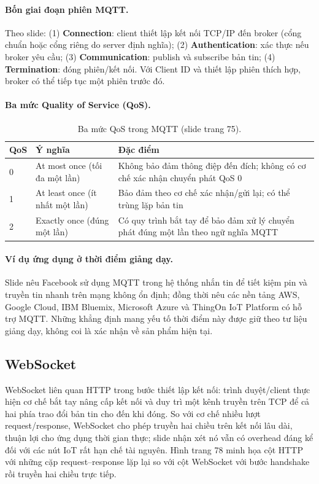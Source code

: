 \paragraph{Bốn giai đoạn phiên MQTT.} Theo slide: (1) \textbf{Connection}: client thiết lập kết nối TCP/IP đến broker (cổng chuẩn hoặc cổng riêng do server định nghĩa); (2) \textbf{Authentication}: xác thực nếu broker yêu cầu; (3) \textbf{Communication}: publish và subscribe bản tin; (4) \textbf{Termination}: đóng phiên/kết nối. Với Client ID và thiết lập phiên thích hợp, broker có thể tiếp tục một phiên trước đó. 

\paragraph{Ba mức Quality of Service (QoS).}
\begin{table}[htbp]\centering\small
\caption{Ba mức QoS trong MQTT (slide trang 75).}
\begin{tabularx}{\textwidth}{p{1.4cm}p{3cm}X}\toprule
QoS & Ý nghĩa & Đặc điểm\\\midrule
0 & At most once (tối đa một lần) & Không bảo đảm thông điệp đến đích; không có cơ chế xác nhận chuyển phát QoS 0\\
1 & At least once (ít nhất một lần) & Bảo đảm theo cơ chế xác nhận/gửi lại; có thể trùng lặp bản tin\\
2 & Exactly once (đúng một lần) & Có quy trình bắt tay để bảo đảm xử lý chuyển phát đúng một lần theo ngữ nghĩa MQTT\\\bottomrule
\end{tabularx}\end{table}

\paragraph{Ví dụ ứng dụng ở thời điểm giảng dạy.} Slide nêu Facebook sử dụng MQTT trong hệ thống nhắn tin để tiết kiệm pin và truyền tin nhanh trên mạng không ổn định; đồng thời nêu các nền tảng AWS, Google Cloud, IBM Bluemix, Microsoft Azure và ThingOn IoT Platform có hỗ trợ MQTT. Những khẳng định mang yếu tố thời điểm này được giữ theo tư liệu giảng dạy, không coi là xác nhận về sản phẩm hiện tại. 

\subsection{WebSocket}
WebSocket liên quan HTTP trong bước thiết lập kết nối: trình duyệt/client thực hiện cơ chế bắt tay nâng cấp kết nối và duy trì một kênh truyền trên TCP để cả hai phía trao đổi bản tin cho đến khi đóng. So với cơ chế nhiều lượt request/response, WebSocket cho phép truyền hai chiều trên kết nối lâu dài, thuận lợi cho ứng dụng thời gian thực; slide nhận xét nó vẫn có overhead đáng kể đối với các nút IoT rất hạn chế tài nguyên. Hình trang 78 minh họa cột HTTP với những cặp request--response lặp lại so với cột WebSocket với bước handshake rồi truyền hai chiều trực tiếp. 

